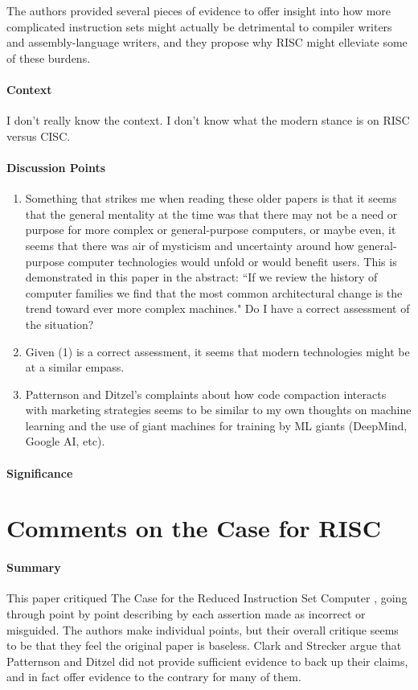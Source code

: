 The authors provided several pieces of evidence to offer insight into how more
complicated instruction sets might actually be detrimental to compiler writers
and assembly-language writers, and they propose why RISC might elleviate some of
these burdens.
\paragraph{\textbf{Context}}
I don't really know the context. I don't know what the modern stance is on RISC
versus CISC.
\paragraph{\textbf{Discussion Points}}
\begin{enumerate}
    \item Something that strikes me when reading these older papers is that it
    seems that the general mentality at the time was that there may not be a
    need or purpose for more complex or general-purpose computers, or maybe
    even, it seems that there was air of mysticism and uncertainty around how
    general-purpose computer technologies would unfold or would benefit users.
    This is demonstrated in this paper in the abstract: ``If we review the
    history of computer families we find that the most common architectural
    change is the trend toward ever more complex machines." Do I have a correct
    assessment of the situation?
    \item Given (1) is a correct assessment, it seems that modern technologies
    might be at a similar empass.
    \item Patternson and Ditzel's complaints about how code compaction interacts
    with marketing strategies seems to be similar to my own thoughts on machine
    learning and the use of giant machines for training by ML giants (DeepMind,
    Google AI, etc).
\end{enumerate}
\paragraph{\textbf{Significance}}

\section {Comments on the Case for RISC \cite{clark1980comments}}

\paragraph{\textbf{Summary}}
This paper critiqued The Case for the Reduced Instruction Set Computer
\cite{patterson1980case}, going through point by point describing by each
assertion made as incorrect or misguided. The authors make individual points,
but their overall critique seems to be that they feel the original paper is
baseless. Clark and Strecker argue that Patternson and Ditzel did not provide
sufficient evidence to back up their claims, and in fact offer evidence to the
contrary for many of them.

